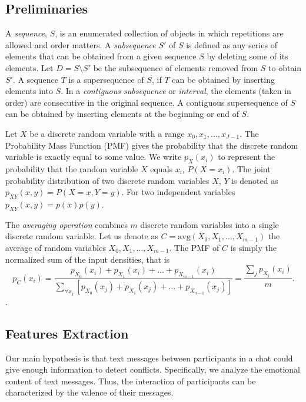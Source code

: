 \documentclass[3p,times,preprint]{elsarticle}
\begin{document}
\subsection{Preliminaries}
A \textit{sequence}, $S$, is an enumerated collection of objects in which repetitions are allowed and order matters. A \textit{subsequence} $S'$ of $S$ is defined as any series of elements that can be obtained from a given sequence $S$ by deleting some of its elements. Let $D = S\setminus S'$ be the subsequence of elements removed from $S$ to obtain $S'$. A sequence $T$ is a supersequence of $S$, if $T$ can be obtained by inserting elements into $S$. In a \textit{contiguous subsequence} or \textit{interval}, the elements (taken in order) are consecutive in the original sequence. A contiguous supersequence of $S$ can be obtained by inserting elements at the beginning or end of $S$.

Let $X$ be a discrete random variable with a range ${x_0,x_1,..., x_{J-1}}$. The  Probability Mass Function (PMF) gives the probability that the discrete random variable is exactly equal to some value. We write $p_X(x_i)$ to represent the probability that the random variable $X$ equals $x_i$, $P(X=x_i)$. The joint probability distribution of two discrete random variables $X$, $Y$ is denoted as $p_{XY}(x,y) = P(X=x,Y=y)$.  For two independent variables $p_{XY}(x,y) = p(x)p(y)$.

The \textit{averaging operation} combines   $m$ discrete random variables into a single discrete random variable. Let us denote as $C = \mathrm{avg} (X_{0},X_{1},\dots, X_{m-1})$ the average of random variables $X_{0},X_{1},\dots, X_{m-1}$. The PMF of $C$ is simply the normalized sum of the input densities, that is
%
\begin{equation}
    p_C(x_i) = \frac{p_{X_0}(x_i) + p_{X_1}(x_i)  + \ldots + p_{X_{m-1}}(x_i)}
    {\sum_{\forall x_j} \left[ p_{X_0}(x_j) + p_{X_1}(x_j)  + \ldots + p_{X_{n-1}}(x_j)\right]} = \frac{\sum_{j}  p_{X_j}(x_i)}{ m}.
\end{equation}.%




\subsection{Features Extraction}

Our main hypothesis is that text messages between participants in a chat could give enough information to detect conflicts. Specifically, we analyze the emotional content of text messages. Thus, the interaction of participants can be characterized by the valence of their messages.
\end{document}
